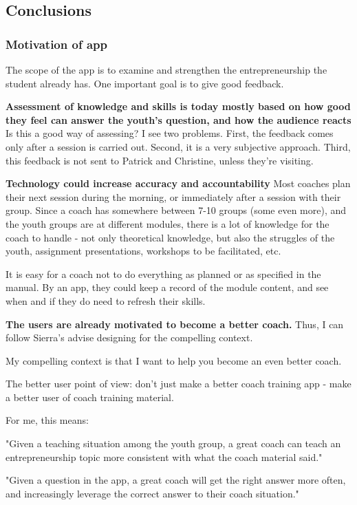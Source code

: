 \subsection{Conclusions}

\subsubsection{Motivation of app}
The scope of the app is to examine and strengthen the entrepreneurship the student already has. One important goal is to give good feedback.

\textbf{Assessment of knowledge and skills is today mostly based on how good they feel can answer the youth’s question, and how the audience reacts}
Is this a good way of assessing? I see two problems. First, the feedback comes only after a session is carried out. Second, it is a very subjective approach. Third, this feedback is not sent to Patrick and Christine, unless they’re visiting.

\textbf{Technology could increase accuracy and accountability}
Most coaches plan their next session during the morning, or immediately after a session with their group. Since a coach has somewhere between 7-10 groups (some even more), and the youth groups are at different modules, there is a lot of knowledge for the coach to handle - not only theoretical knowledge, but also the struggles of the youth, assignment presentations, workshops to be facilitated, etc.

It is easy for a coach not to do everything as planned or as specified in the manual. By an app, they could keep a record of the module content, and see when and if they do need to refresh their skills.

\textbf{The users are already motivated to become a better coach.} Thus, I can follow Sierra's advise designing for the compelling context.

My compelling context is that I want to help you become an even better coach.

The better user point of view: don’t just make a better coach training app - make a better user of coach training material.

For me, this means:

"Given a teaching situation among the youth group, a great coach can teach an entrepreneurship topic more consistent with what the coach material said."

"Given a question in the app, a great coach will get the right answer more often, and increasingly leverage the correct answer to their coach situation."

